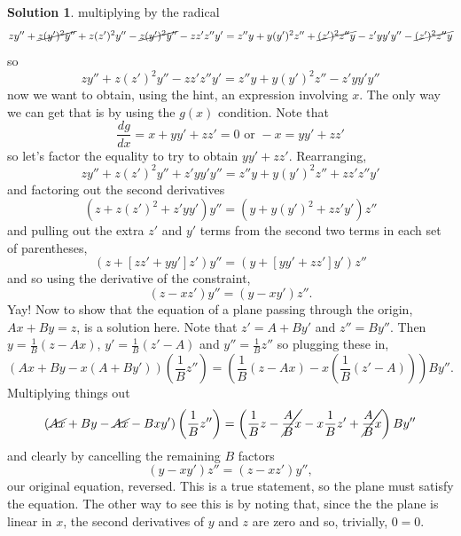 \documentclass[10pt]{article}
\theoremstyle{definition}
\newtheorem{soln}{Solution}
\begin{document}
\begin{soln}
  multiplying by the radical
  $$zy''+\cancel{z(y')^2y''}+z(z')^2y''-\cancel{z(y')^2y''}-zz'z''y'=z''y+y(y')^2z''+\cancel{(z')^2z''y}-z'yy'y''-\cancel{(z')^2z''y}$$
  so
  $$zy''+z(z')^2y''-zz'z''y'=z''y+y(y')^2z''-z'yy'y''$$
  now we want to obtain, using the hint, an expression involving $x$. The only way we can get that is by using the
  $g(x)$ condition. Note that
  $$\frac{dg}{dx}=x+yy'+zz'=0\text{ or } -x=yy'+zz'$$
  so let's factor the equality to try to obtain $yy'+zz'$. Rearranging,
  $$zy''+z(z')^2y''+z'yy'y''=z''y+y(y')^2z''+zz'z''y'$$
  and factoring out the second derivatives
  $$\left(z+z(z')^2+z'yy'\right)y''=\left(y+y(y')^2+zz'y'\right)z''$$
  and pulling out the extra $z'$ and $y'$ terms from the second two terms in each set of parentheses,
  $$\left(z+\left[zz'+yy'\right]z'\right)y''=\left(y+\left[yy'+zz'\right]y'\right)z''$$
  and so using the derivative of the constraint,
  $$\left(z-xz'\right)y''=\left(y-xy'\right)z''.$$
  Yay! Now to show that the equation of a plane passing through the origin, $Ax+By=z$, is a solution here.
  Note that $z'=A+By'$ and $z''=By''$. Then $y=\frac{1}{B}\left(z-Ax\right)$, $y'=\frac{1}{B}\left(z'-A\right)$ and $y''=\frac{1}{B}z''$ so
  plugging these in,
  $$\left(Ax+By-x(A+By')\right)\left(\frac{1}{B}z''\right)=\left(\frac{1}{B}\left(z-Ax\right)-x\left(\frac{1}{B}\left(z'-A\right)\right)\right)By''.$$
  Multiplying things out
  $$\left(\cancel{Ax}+By-\cancel{Ax}-Bxy'\right)\left(\frac{1}{B}z''\right)=\left(\frac{1}{B}z-\cancel{\frac{A}{B}x}-x\frac{1}{B}z'+\cancel{\frac{A}{B}x}\right)By''$$
  and clearly by cancelling the remaining $B$ factors
  $$\left(y-xy'\right)z''=\left(z-xz'\right)y'',$$
  our original equation, reversed. This is a true statement, so the plane must satisfy the equation. The other way to see this is by noting that,
  since the the plane is linear in $x$, the second derivatives of $y$ and $z$ are zero and so, trivially, $0=0$.
\end{soln}
\end{document}
